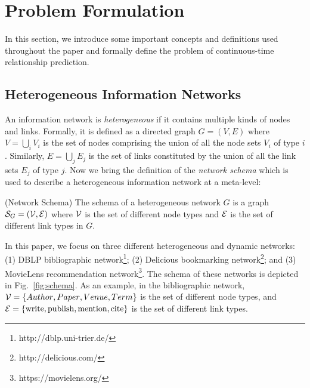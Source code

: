 \section{Problem Formulation}\label{sec:problem}
In this section, we introduce some important concepts and definitions used throughout the paper and formally define the problem of continuous-time relationship prediction.

\subsection{Heterogeneous Information Networks}

An information network is \emph{heterogeneous} if it contains multiple kinds of nodes and links. Formally, it is defined as a directed graph $G=(V,E)$ where $V = \bigcup_i V_i$ is the set of nodes comprising the union of all the node sets $V_i$ of type $i$. Similarly, $E=\bigcup_j E_j$ is the set of links constituted by the union of all the link sets $E_j$ of type $j$. Now we bring the definition of the \emph{network schema} \cite{sun2011pathsim} which is used to describe a heterogeneous information network at a meta-level:

\begin{definition}{(Network Schema)}
	The schema of a heterogeneous network $G$ is a graph $\mathcal{S}_G=(\mathcal{V}, \mathcal{E})$ where $\mathcal{V}$ is the set of different node types and $\mathcal{E}$ is the set of different link types in $G$.
\end{definition}

In this paper, we focus on three different heterogeneous and dynamic networks: (1) DBLP bibliographic network\footnote{http://dblp.uni-trier.de/}; (2) Delicious bookmarking network\footnote{http://delicious.com/}; and (3) MovieLens recommendation network\footnote{https://movielens.org/}. The schema of these networks is depicted in Fig.~\ref{fig:schema}. As an example, in the bibliographic network, $\mathcal{V}=\left\lbrace {Author}, {Paper}, {Venue}, {Term}\right\rbrace$ is the set of different node types, and $\mathcal{E}=\left\lbrace\text{write}, \text{publish}, \text{mention}, \text{cite}\right\rbrace$ is the set of different link types.

